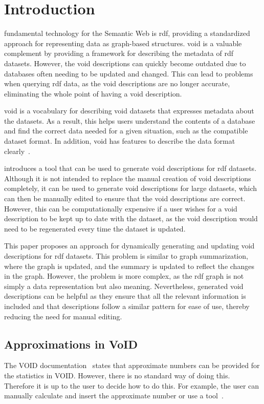 \section{Introduction}\label{sec:introduction2}
 fundamental technology for the Semantic Web is \gls{rdf}, providing a standardized approach for representing data as graph-based structures. \gls{void} is a valuable complement by providing a framework for describing the metadata of \gls{rdf} datasets. However, the \gls{void} descriptions can quickly become outdated due to databases often needing to be updated and changed. This can lead to problems when querying \gls{rdf} data, as the \gls{void} descriptions are no longer accurate, eliminating the whole point of having a \gls{void} description.

\gls{void} is a vocabulary for describing \gls{void} datasets that expresses metadata about the datasets. As a result, this helps users understand the contents of a database and find the correct data needed for a given situation, such as the compatible dataset format. In addition, \gls{void} has features to describe the data format clearly~\cite{documentation-void}.

\cite{creating-void-descriptions} introduces a tool that can be used to generate \gls{void} descriptions for \gls{rdf} datasets. Although it is not intended to replace the manual creation of \gls{void} descriptions completely, it can be used to generate \gls{void} descriptions for large datasets, which can then be manually edited to ensure that the \gls{void} descriptions are correct. However, this can be computationally expensive if a user wishes for a \gls{void} description to be kept up to date with the dataset, as the \gls{void} description would need to be regenerated every time the dataset is updated.

This paper proposes an approach for dynamically generating and updating \gls{void} descriptions for \gls{rdf} datasets. This problem is similar to graph summarization, where the graph is updated, and the summary is updated to reflect the changes in the graph. However, the problem is more complex, as the \gls{rdf} graph is not simply a data representation but also meaning. Nevertheless, generated \gls{void} descriptions can be helpful as they ensure that all the relevant information is included and that descriptions follow a similar pattern for ease of use, thereby reducing the need for manual editing.

\subsection{Approximations in VoID} \label{sec:approximations}
The VOID documentation~\cite{documentation-void} states that approximate numbers can be provided for the statistics in VOID.
However, there is no standard way of doing this. Therefore it is up to the user to decide how to do this. For example, the user can manually calculate and insert the approximate number or use a tool~\cite{the-web-of-data}.

